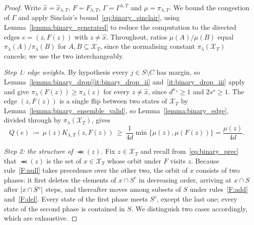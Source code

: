 \documentclass[aos]{imsart}%
\DeclarePairedDelimiter{\abs}{\lvert}{\rvert}
\newcommand{\ambientspace}[0]{\mathcal{X}}
\theoremstyle{plain}
\theoremstyle{definition}
\begin{document}
    \begin{proof}
        Write $\hat x=\hat x_{\lambda,T}$, $F=F_{\lambda,T}$,
        $\Gamma=\Gamma^{\lambda,T}$ and $\mu=\pi_{\lambda,T}$. We bound the
        congestion of $\Gamma$ and apply Sinclair's
        bound~\eqref{eq:binary_sinclair}, using
        Lemma~\ref{lemma:binary_generated} to reduce the computation to the
        directed edges $e=(z,F(z))$ with $z\neq\hat x$. Throughout, ratios
        $\mu(A)/\mu(B)$ equal $\pi_\lambda(A)/\pi_\lambda(B)$ for
        $A,B\subseteq\ambientspace_T$, since the normalising constant
        $\pi_\lambda(\ambientspace_T)$ cancels; we use the two
        interchangeably.

        \emph{Step 1: edge weights.} By hypothesis every $j\in S\setminus C$
        has margin, so Lemma~\ref{lemma:binary_drop}\ref{it:binary_drop_ii}
        and~\ref{it:binary_drop_iii} apply and give
        $\pi_\lambda(F(z))\geq\pi_\lambda(z)$ for every $z\neq\hat x$, since
        $d^{\kappa_\lambda}\geq1$ and $2s^{\star}\geq1$. The edge $(z,F(z))$
        is a single flip between two states of $\ambientspace_T$ by
        Lemma~\ref{lemma:binary_ensemble_valid}, so
        Lemma~\ref{lemma:binary_edge}, divided through by
        $\pi_\lambda(\ambientspace_T)$, gives
        \begin{equation}
            \label{eq:binary_margin_Q}
            Q(e)\ \coloneq\ \mu(z)K_{\lambda,T}(z,F(z))
            \ \geq\ \frac{1}{4d}\min\{\mu(z),\mu(F(z))\}
            =\frac{\mu(z)}{4d} .
        \end{equation}

        \emph{Step 2: the structure of $\Prec(z)$.} Fix $z\in\ambientspace_T$
        and recall from~\eqref{eq:binary_prec} that $\Prec(z)$ is the set of
        $x\in\ambientspace_T$ whose orbit under $F$ visits $z$. Because
        rule~\ref{F:null} takes precedence over the other two, the orbit of $x$
        consists of two phases: it first deletes the elements of $x\cap S^{c}$
        in decreasing order, arriving at $x\cap S$ after $\abs{x\cap S^{c}}$
        steps, and thereafter moves among subsets of $S$ under
        rules~\ref{F:add} and~\ref{F:del}. Every state of the first phase meets
        $S^{c}$, except the last one; every state of the second phase is
        contained in $S$. We distinguish two cases accordingly, which are
        exhaustive.


\end{proof}
\end{document}
